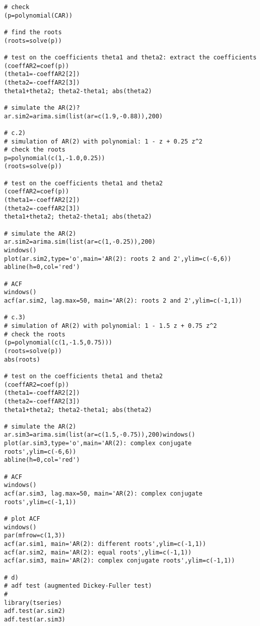 \begin{example}
\begin{verbatim}
# check
(p=polynomial(CAR))

# find the roots
(roots=solve(p))

# test on the coefficients theta1 and theta2: extract the coefficients
(coeffAR2=coef(p))
(theta1=-coeffAR2[2])
(theta2=-coeffAR2[3])
theta1+theta2; theta2-theta1; abs(theta2)

# simulate the AR(2)?
ar.sim2=arima.sim(list(ar=c(1.9,-0.88)),200)

# c.2)
# simulation of AR(2) with polynomial: 1 - z + 0.25 z^2
# check the roots
p=polynomial(c(1,-1.0,0.25))
(roots=solve(p))

# test on the coefficients theta1 and theta2
(coeffAR2=coef(p))
(theta1=-coeffAR2[2])
(theta2=-coeffAR2[3])
theta1+theta2; theta2-theta1; abs(theta2)

# simulate the AR(2)
ar.sim2=arima.sim(list(ar=c(1,-0.25)),200)
windows()
plot(ar.sim2,type='o',main='AR(2): roots 2 and 2',ylim=c(-6,6))
abline(h=0,col='red')

# ACF
windows()
acf(ar.sim2, lag.max=50, main='AR(2): roots 2 and 2',ylim=c(-1,1))

# c.3)
# simulation of AR(2) with polynomial: 1 - 1.5 z + 0.75 z^2
# check the roots
(p=polynomial(c(1,-1.5,0.75)))
(roots=solve(p))
abs(roots)

# test on the coefficients theta1 and theta2
(coeffAR2=coef(p))
(theta1=-coeffAR2[2])
(theta2=-coeffAR2[3])
theta1+theta2; theta2-theta1; abs(theta2)

# simulate the AR(2)
ar.sim3=arima.sim(list(ar=c(1.5,-0.75)),200)windows()
plot(ar.sim3,type='o',main='AR(2): complex conjugate roots',ylim=c(-6,6))
abline(h=0,col='red')

# ACF
windows()
acf(ar.sim3, lag.max=50, main='AR(2): complex conjugate roots',ylim=c(-1,1))

# plot ACF
windows()
par(mfrow=c(1,3))
acf(ar.sim1, main='AR(2): different roots',ylim=c(-1,1))
acf(ar.sim2, main='AR(2): equal roots',ylim=c(-1,1))
acf(ar.sim3, main='AR(2): complex conjugate roots',ylim=c(-1,1))

# d)
# adf test (augmented Dickey-Fuller test)
#
library(tseries)
adf.test(ar.sim2)
adf.test(ar.sim3)
    \end{verbatim}
\end{example}

